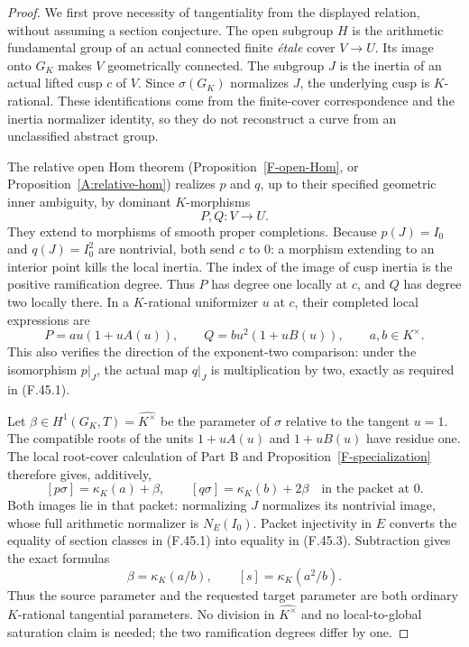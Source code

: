 \begin{proof}
We first prove necessity of tangentiality from the displayed
relation, without assuming a section conjecture. The open subgroup
$H$ is the arithmetic fundamental group of an actual connected
finite \emph{\'etale} cover $V\to U$. Its image onto $G_K$ makes
$V$ geometrically connected. The subgroup $J$ is the inertia of
an actual lifted cusp $c$ of $V$. Since $\sigma(G_K)$ normalizes
$J$, the underlying cusp is $K$-rational. These identifications
come from the finite-cover correspondence and the inertia
normalizer identity, so they do not reconstruct a curve from an
unclassified abstract group.

The relative open Hom theorem
(Proposition~\ref{F-open-Hom}, or
Proposition~\ref{A:relative-hom}) realizes $p$ and $q$, up to
their specified geometric inner ambiguity, by dominant
$K$-morphisms
\[
                          P,Q:V\longrightarrow U.
\]
They extend to morphisms of smooth proper completions. Because
$p(J)=I_0$ and $q(J)=I_0^2$ are nontrivial, both send $c$ to
$0$: a morphism extending to an interior point kills the local
inertia. The index of the image of cusp inertia is the positive
ramification degree. Thus $P$ has degree one locally at $c$, and
$Q$ has degree two locally there. In a $K$-rational uniformizer
$u$ at $c$, their completed local expressions are
\[
 P=a u(1+uA(u)),\qquad
 Q=b u^2(1+uB(u)),\qquad a,b\in K^\times.
 \tag{F.45.2}
\]
This also verifies the direction of the exponent-two comparison:
under the isomorphism $p|_J$, the actual map $q|_J$ is
multiplication by two, exactly as required in (F.45.1).

Let $\beta\in H^1(G_K,T)=\widehat{K^\times}$ be the parameter
of $\sigma$ relative to the tangent $u=1$. The compatible roots
of the units $1+uA(u)$ and $1+uB(u)$ have residue one. The local
root-cover calculation of Part B and
Proposition~\ref{F-specialization} therefore gives, additively,
\[
 [p\sigma]=\kappa_K(a)+\beta,
       \qquad [q\sigma]=\kappa_K(b)+2\beta
       \quad\text{in the packet at }0.
 \tag{F.45.3}
\]
Both images lie in that packet: normalizing $J$ normalizes its
nontrivial image, whose full arithmetic normalizer is
$N_E(I_0)$. Packet injectivity in $E$ converts the equality of
section classes in (F.45.1) into equality in (F.45.3). Subtraction
gives the exact formulas
\[
 \beta=\kappa_K(a/b),\qquad
                  [s]=\kappa_K(a^2/b).
 \tag{F.45.4}
\]
Thus the source parameter and the requested target parameter are
both ordinary $K$-rational tangential parameters. No division in
$\widehat{K^\times}$ and no local-to-global saturation claim is
needed; the two ramification degrees differ by one.


\end{proof}
